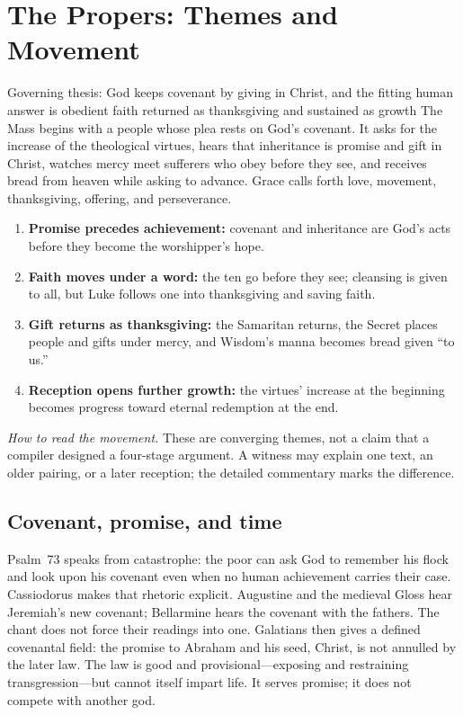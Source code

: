 \section*{The Propers: Themes and Movement}
\label{triptych:brief-synthesis:start}

\begin{massbox}{Governing thesis: God keeps covenant by giving in Christ, and the fitting human answer is obedient faith returned as thanksgiving and sustained as growth}
The Mass begins with a people whose plea rests on God's covenant. It asks for
the increase of the theological virtues, hears that inheritance is promise and
gift in Christ, watches mercy meet sufferers who obey before they see, and
receives bread from heaven while asking to advance. Grace calls forth love,
movement, thanksgiving, offering, and perseverance.
\end{massbox}

\begin{enumerate}[leftmargin=1.5em,itemsep=0.1em]
\item \textbf{Promise precedes achievement:} covenant and inheritance are God's acts before they become the worshipper's hope.
\item \textbf{Faith moves under a word:} the ten go before they see; cleansing is given to all, but Luke follows one into thanksgiving and saving faith.
\item \textbf{Gift returns as thanksgiving:} the Samaritan returns, the Secret places people and gifts under mercy, and Wisdom's manna becomes bread given ``to us.''
\item \textbf{Reception opens further growth:} the virtues' increase at the beginning becomes progress toward eternal redemption at the end.
\end{enumerate}

\noindent\emph{How to read the movement.} These are converging themes, not a
claim that a compiler designed a four-stage argument. A witness may explain one
text, an older pairing, or a later reception; the detailed commentary marks the
difference.

\subsection*{Covenant, promise, and time}

Psalm~73 speaks from catastrophe: the poor can ask God to remember his flock
and look upon his covenant even when no human achievement carries their case.
Cassiodorus makes that rhetoric explicit. Augustine and the medieval Gloss
hear Jeremiah's new covenant; Bellarmine hears the covenant with the fathers.
The chant does not force their readings into one. Galatians then gives a
defined covenantal field: the promise to Abraham and his seed, Christ, is not
annulled by the later law. The law is good and provisional---exposing and
restraining transgression---but cannot itself impart life. It serves promise;
it does not compete with another god.

